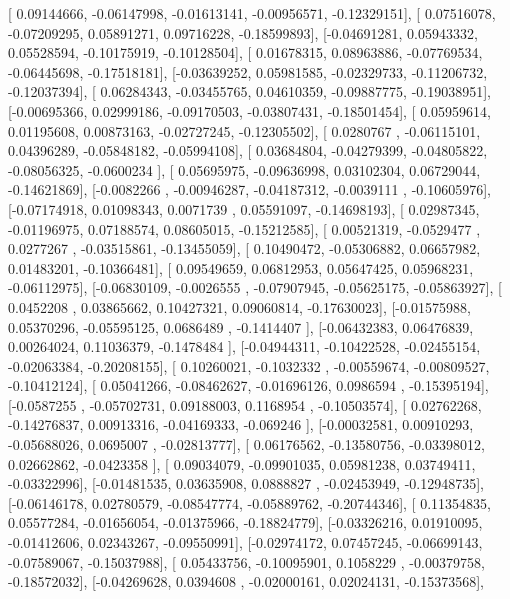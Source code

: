 \documentclass{article}
\begin{document}
       [ 0.09144666, -0.06147998, -0.01613141, -0.00956571, -0.12329151],
       [ 0.07516078, -0.07209295,  0.05891271,  0.09716228, -0.18599893],
       [-0.04691281,  0.05943332,  0.05528594, -0.10175919, -0.10128504],
       [ 0.01678315,  0.08963886, -0.07769534, -0.06445698, -0.17518181],
       [-0.03639252,  0.05981585, -0.02329733, -0.11206732, -0.12037394],
       [ 0.06284343, -0.03455765,  0.04610359, -0.09887775, -0.19038951],
       [-0.00695366,  0.02999186, -0.09170503, -0.03807431, -0.18501454],
       [ 0.05959614,  0.01195608,  0.00873163, -0.02727245, -0.12305502],
       [ 0.0280767 , -0.06115101,  0.04396289, -0.05848182, -0.05994108],
       [ 0.03684804, -0.04279399, -0.04805822, -0.08056325, -0.0600234 ],
       [ 0.05695975, -0.09636998,  0.03102304,  0.06729044, -0.14621869],
       [-0.0082266 , -0.00946287, -0.04187312, -0.0039111 , -0.10605976],
       [-0.07174918,  0.01098343,  0.0071739 ,  0.05591097, -0.14698193],
       [ 0.02987345, -0.01196975,  0.07188574,  0.08605015, -0.15212585],
       [ 0.00521319, -0.0529477 ,  0.0277267 , -0.03515861, -0.13455059],
       [ 0.10490472, -0.05306882,  0.06657982,  0.01483201, -0.10366481],
       [ 0.09549659,  0.06812953,  0.05647425,  0.05968231, -0.06112975],
       [-0.06830109, -0.0026555 , -0.07907945, -0.05625175, -0.05863927],
       [ 0.0452208 ,  0.03865662,  0.10427321,  0.09060814, -0.17630023],
       [-0.01575988,  0.05370296, -0.05595125,  0.0686489 , -0.1414407 ],
       [-0.06432383,  0.06476839,  0.00264024,  0.11036379, -0.1478484 ],
       [-0.04944311, -0.10422528, -0.02455154, -0.02063384, -0.20208155],
       [ 0.10260021, -0.1032332 , -0.00559674, -0.00809527, -0.10412124],
       [ 0.05041266, -0.08462627, -0.01696126,  0.0986594 , -0.15395194],
       [-0.0587255 , -0.05702731,  0.09188003,  0.1168954 , -0.10503574],
       [ 0.02762268, -0.14276837,  0.00913316, -0.04169333, -0.069246  ],
       [-0.00032581,  0.00910293, -0.05688026,  0.0695007 , -0.02813777],
       [ 0.06176562, -0.13580756, -0.03398012,  0.02662862, -0.0423358 ],
       [ 0.09034079, -0.09901035,  0.05981238,  0.03749411, -0.03322996],
       [-0.01481535,  0.03635908,  0.0888827 , -0.02453949, -0.12948735],
       [-0.06146178,  0.02780579, -0.08547774, -0.05889762, -0.20744346],
       [ 0.11354835,  0.05577284, -0.01656054, -0.01375966, -0.18824779],
       [-0.03326216,  0.01910095, -0.01412606,  0.02343267, -0.09550991],
       [-0.02974172,  0.07457245, -0.06699143, -0.07589067, -0.15037988],
       [ 0.05433756, -0.10095901,  0.1058229 , -0.00379758, -0.18572032],
       [-0.04269628,  0.0394608 , -0.02000161,  0.02024131, -0.15373568],
\end{document}
